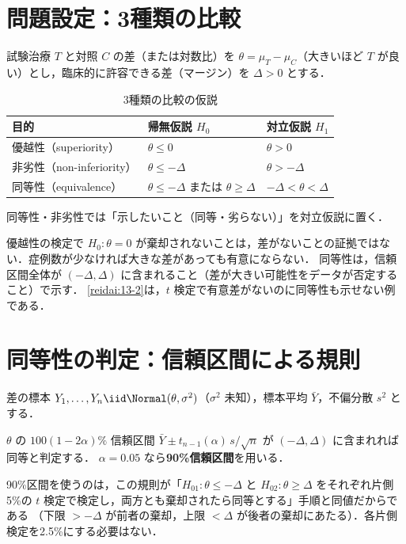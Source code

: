 \section{問題設定：3種類の比較}\label{sec:13-setting}
試験治療 $T$ と対照 $C$ の差（または対数比）を $\theta=\mu_T-\mu_C$（大きいほど $T$ が良い）とし，臨床的に許容できる差（マージン）を $\Delta>0$ とする．
\begin{table}[htbp]
\centering\small
\caption{3種類の比較の仮説}\label{tab:13-hyp}
\begin{tabular}{@{}lll@{}}
\toprule
目的 & 帰無仮説 $H_0$ & 対立仮説 $H_1$\\
\midrule
優越性（superiority） & $\theta\le0$ & $\theta>0$\\
非劣性（non-inferiority） & $\theta\le-\Delta$ & $\theta>-\Delta$\\
同等性（equivalence） & $\theta\le-\Delta$ または $\theta\ge\Delta$ & $-\Delta<\theta<\Delta$\\
\bottomrule
\end{tabular}
\end{table}
同等性・非劣性では「示したいこと（同等・劣らない）」を対立仮説に置く．
\begin{warnbox}[「有意差なし」と「同等」]
優越性の検定で $H_0:\theta=0$ が棄却されないことは，差がないことの証拠ではない．症例数が少なければ大きな差があっても有意にならない．
同等性は，信頼区間全体が $(-\Delta,\Delta)$ に含まれること（差が大きい可能性をデータが否定すること）で示す．
\cref{reidai:13-2}は，$t$ 検定で有意差がないのに同等性も示せない例である．
\end{warnbox}

\section{同等性の判定：信頼区間による規則}\label{sec:13-equiv}
\Hissu
差の標本 $Y_1,\dots,Y_n\iid\Normal(\theta,\sigma^2)$（$\sigma^2$ 未知），標本平均 $\bar Y$，不偏分散 $s^2$ とする．
\begin{pointbox}[同等性の判定規則]
$\theta$ の $100(1-2\alpha)\%$ 信頼区間 $\bar Y\pm t_{n-1}(\alpha)\,s/\sqrt n$ が $(-\Delta,\Delta)$ に含まれれば同等と判定する．
$\alpha=0.05$ なら\textbf{90\%信頼区間}を用いる．
\end{pointbox}
90\%区間を使うのは，この規則が「$H_{01}:\theta\le-\Delta$ と $H_{02}:\theta\ge\Delta$ をそれぞれ片側5\%の $t$ 検定で検定し，両方とも棄却されたら同等とする」手順と同値だからである
（下限 $>-\Delta$ が前者の棄却，上限 $<\Delta$ が後者の棄却にあたる）．各片側検定を2.5\%にする必要はない．

